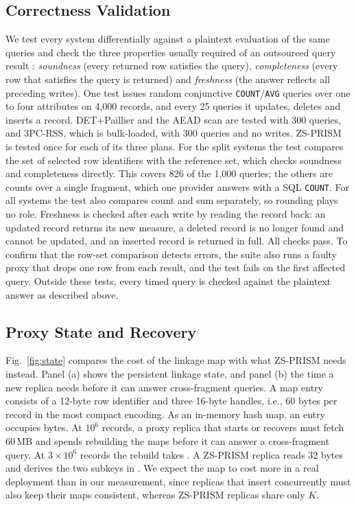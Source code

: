 \documentclass[conference]{IEEEtran}
\newcommand{\sys}{ZS-PRISM}
\begin{document}
\subsection{Correctness Validation}
We test every system differentially against a plaintext evaluation of the same queries and check the three properties usually required of an outsourced query result \cite{li2006authenticated}: \emph{soundness} (every returned row satisfies the query), \emph{completeness} (every row that satisfies the query is returned) and \emph{freshness} (the answer reflects all preceding writes). One test issues \CorrQueries{} random conjunctive \texttt{COUNT}/\texttt{AVG} queries over one to four attributes on 4,000 records, and every 25 queries it updates, deletes and inserts a record. DET+Paillier and the AEAD scan are tested with 300 queries, and 3PC-RSS, which is bulk-loaded, with 300 queries and no writes. \sys{} is tested once for each of its three plans. For the split systems the test compares the set of selected row identifiers with the reference set, which checks soundness and completeness directly. This covers 826 of the 1,000 queries; the others are counts over a single fragment, which one provider answers with a SQL \texttt{COUNT}. For all systems the test also compares count and sum separately, so rounding plays no role. Freshness is checked after each write by reading the record back: an updated record returns its new measure, a deleted record is no longer found and cannot be updated, and an inserted record is returned in full. All checks pass. To confirm that the row-set comparison detects errors, the suite also runs a faulty proxy that drops one row from each result, and the test fails on the first affected query. Outside these tests, every timed query is checked against the plaintext answer as described above.

\subsection{Proxy State and Recovery}
Fig.~\ref{fig:state} compares the cost of the linkage map with what \sys{} needs instead. Panel (a) shows the persistent linkage state, and panel (b) the time a new replica needs before it can answer cross-fragment queries. A map entry consists of a 12-byte row identifier and three 16-byte handles, i.e., 60 bytes per record in the most compact encoding. As an in-memory hash map, an entry occupies \MapHeapPerRec{} bytes. At $10^6$ records, a proxy replica that starts or recovers must fetch 60\,MB and spends \MapBootMillion{} rebuilding the maps before it can answer a cross-fragment query. At $3\times10^6$ records the rebuild takes \MapBootThree{}. A \sys{} replica reads 32 bytes and derives the two subkeys in \ZSBoot{}. We expect the map to cost more in a real deployment than in our measurement, since replicas that insert concurrently must also keep their maps consistent, whereas \sys{} replicas share only $K$.
\end{document}
